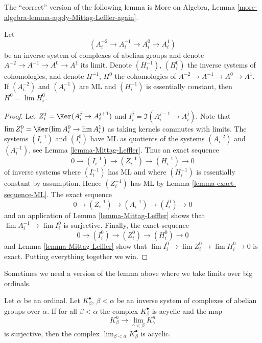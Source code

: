\noindent
The ``correct'' version of the following lemma is
More on Algebra, Lemma \ref{more-algebra-lemma-apply-Mittag-Leffler-again}.

\begin{lemma}
\label{lemma-apply-Mittag-Leffler-again}
Let
$$
(A^{-2}_i \to A^{-1}_i \to A^0_i \to A^1_i)
$$
be an inverse system of complexes of abelian groups and denote
$A^{-2} \to A^{-1} \to A^0 \to A^1$ its limit. Denote
$(H_i^{-1})$, $(H_i^0)$ the inverse systems of cohomologies, and
denote $H^{-1}$, $H^0$ the cohomologies of $A^{-2} \to A^{-1} \to A^0 \to A^1$.
If $(A^{-2}_i)$ and $(A^{-1}_i)$ are ML and
$(H^{-1}_i)$ is essentially constant, then
$H^0 = \lim H_i^0$.
\end{lemma}

\begin{proof}
Let $Z^j_i = \Ker(A^j_i \to A^{j + 1}_i)$ and
$I^j_i = \Im(A^{j - 1}_i \to A^j_i)$.
Note that $\lim Z^0_i = \Ker(\lim A^0_i \to \lim A^1_i)$ as
taking kernels commutes with limits.
The systems $(I^{-1}_i)$ and $(I^0_i)$ have ML as quotients of
the systems $(A^{-2}_i)$ and $(A^{-1}_i)$, see
Lemma \ref{lemma-Mittag-Leffler}.
Thus an exact sequence
$$
0 \to (I^{-1}_i) \to (Z^{-1}_i) \to (H^{-1}_i) \to 0
$$
of inverse systems where $(I^{-1}_i)$ has ML
and where $(H^{-1}_i)$ is essentially constant by assumption.
Hence $(Z^{-1}_i)$ has ML by
Lemma \ref{lemma-exact-sequence-ML}.
The exact sequence
$$
0 \to (Z^{-1}_i) \to (A^{-1}_i) \to (I^0_i) \to 0
$$
and an application of
Lemma \ref{lemma-Mittag-Leffler}
shows that $\lim A^{-1}_i \to \lim I^0_i$ is surjective.
Finally, the exact sequence
$$
0 \to (I^0_i) \to (Z^0_i) \to (H^0_i) \to 0
$$
and
Lemma \ref{lemma-Mittag-Leffler}
show that $\lim I^0_i \to \lim Z^0_i \to \lim H^0_i \to 0$
is exact. Putting everything together we win.
\end{proof}

\noindent
Sometimes we need a version of the lemma above where we take limits
over big ordinals.

\begin{lemma}
\label{lemma-ML-over-ordinals}
Let $\alpha$ be an ordinal. Let $K_\beta^\bullet$, $\beta < \alpha$
be an inverse system of complexes of abelian groups over $\alpha$. If
for all $\beta < \alpha$ the complex $K_\beta^\bullet$ is acyclic and
the map
$$
K^n_\beta \longrightarrow \lim_{\gamma < \beta} K^n_\gamma
$$
is surjective, then the complex
$\lim_{\beta < \alpha} K_\beta^\bullet$ is acyclic.
\end{lemma}

